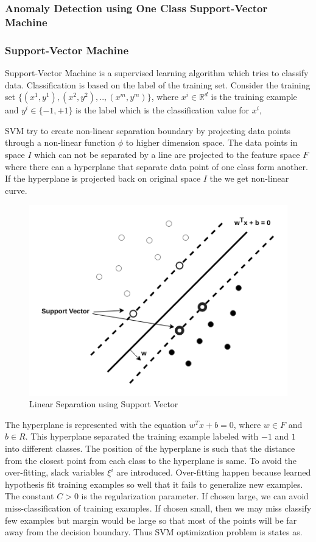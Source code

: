 \documentclass[10pt,oneside,a4paper]{article}
\begin{document}
\subsubsection{Anomaly Detection using One Class Support-Vector Machine}

\subsubsection{Support-Vector Machine}

Support-Vector Machine is a supervised learning algorithm which tries to classify data. Classification is based on the label of the training set. Consider the training set $\{(x^{1},y^{1}),(x^{2},y^{2}), .., (x^{m},y^{m})\}$, where $x^{i} \in \mathbb{R}^d$ is the training example and $y^{i} \in \{-1, +1\}$ is the label which is the classification value for $x^{i}$,

SVM try to create non-linear separation boundary by projecting data points through a non-linear function $\phi$ to higher dimension space. The data points in space $I$ which can not be separated by a line are projected to the feature space $F$ where there can a hyperplane that separate data point of one class form another. If the hyperplane is projected back on original space $I$ the we get non-linear curve.

\begin{figure}[H]
\centering
\includegraphics[scale=0.5]{SVM}
\caption{Linear Separation using Support Vector} \label{fig:SVM}
\end{figure}

The hyperplane is represented with the equation $w^{T}x + b = 0$, where $w \in F$ and $b \in R$. This hyperplane separated the training example labeled with $-1$ and $1$ into different classes. The position of the hyperplane is such that the distance from the closest point from each class to the hyperplane is same. To avoid the over-fitting, slack variables $\xi^{i}$ are introduced. Over-fitting happen because learned hypothesis fit training examples so well that it fails to generalize new examples. The constant $C > 0$ is the regularization parameter. If chosen large, we can avoid miss-classification of training examples. If chosen small, then we may miss classify few examples but margin would be large so that most of the points will be far away from the decision boundary. Thus SVM optimization problem is states as.\cite{SVM} \cite{svm-ml}
\end{document}
